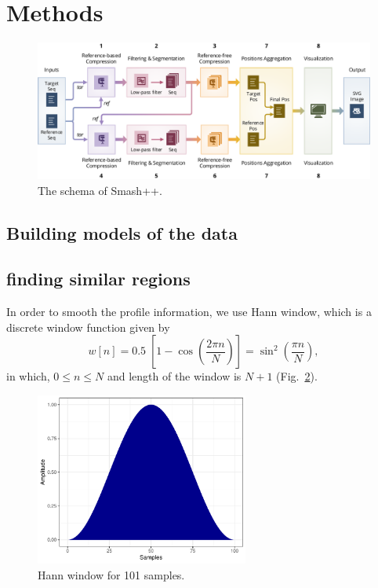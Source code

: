 \clearpage
\section{Methods}
\label{sec.methods}

\begin{figure}[!h]
\includegraphics[width=\linewidth]{schema.pdf}
\caption{The schema of Smash++.}
\label{fig.schema}
\end{figure}

\subsection{Building models of the data}

\subsection{finding similar regions}

In order to smooth the profile information, we use Hann window, which is a discrete window function given by
\begin{equation}
  \label{eq.hann}
  w[n]=0.5\;\left[1-\cos \left({\frac {2\pi n}{N}}\right)\right]=\sin ^{2}\left({\frac {\pi n}{N}}\right),
\end{equation}
in which, $0\le n\le N$ and length of the window is $N+1$ (Fig.~\ref{fig.hann}).
\begin{figure}[!h]
  \centering
\includegraphics[width=7cm]{hann.pdf}
\caption{Hann window for 101 samples.}
\label{fig.hann}
\end{figure}

